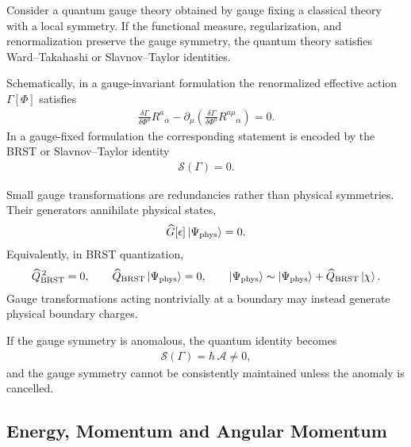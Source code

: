 \documentclass[../QFT_main.tex]{subfiles}
\begin{document}
\begin{mytheorem}
Consider a quantum gauge theory obtained by gauge fixing a classical
theory with a local symmetry. If the functional measure,
regularization, and renormalization preserve the gauge symmetry, the
quantum theory satisfies Ward--Takahashi or Slavnov--Taylor identities.

Schematically, in a gauge-invariant formulation the renormalized
effective action $\Gamma[\Phi]$ satisfies
{\small\begin{align}
    \frac{\delta\Gamma}{\delta\Phi^a}R^a{}_\alpha
    -
    \partial_\mu\!
    \left(
        \frac{\delta\Gamma}{\delta\Phi^a}
        R^{a\mu}{}_\alpha
    \right)
    =0 .
\end{align}}
In a gauge-fixed formulation the corresponding statement is encoded
by the BRST or Slavnov--Taylor identity
{\small\begin{align}
    \mathcal S(\Gamma)=0 .
\end{align}}

Small gauge transformations are redundancies rather than physical
symmetries. Their generators annihilate physical states,
{\small\begin{align}
    \widehat G[\epsilon]\ket{\Psi_{\mathrm{phys}}}=0 .
\end{align}}
Equivalently, in BRST quantization,
{\small\begin{align}
    \widehat Q_{\mathrm{BRST}}^{\,2}=0,
    \qquad
    \widehat Q_{\mathrm{BRST}}\ket{\Psi_{\mathrm{phys}}}=0,
    \qquad
    \ket{\Psi_{\mathrm{phys}}}
    \sim
    \ket{\Psi_{\mathrm{phys}}}
    +\widehat Q_{\mathrm{BRST}}\ket{\chi}.
\end{align}}
Gauge transformations acting nontrivially at a boundary may instead
generate physical boundary charges.

If the gauge symmetry is anomalous, the quantum identity becomes
{\small\begin{align}
    \mathcal S(\Gamma)
    =\hbar\,\mathcal A\neq0 ,
\end{align}}
and the gauge symmetry cannot be consistently maintained unless the
anomaly is cancelled.
\end{mytheorem}





\subsection{Energy, Momentum and Angular Momentum}
\end{document}
